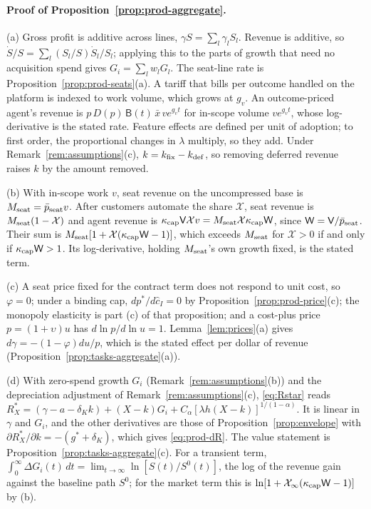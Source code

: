 \paragraph{Proof of Proposition~\ref{prop:prod-aggregate}.}
(a) Gross profit is additive across lines, $\gamma S=\sum_l\gamma_lS_l$. Revenue is additive, so $\dot S/S=\sum_l(S_l/S)\dot S_l/S_l$; applying this to the parts of growth that need no acquisition spend gives $G_i=\sum_lw_lG_l$. The seat-line rate is Proposition~\ref{prop:prod-seats}(a). A tariff that bills per outcome handled on the platform is indexed to work volume, which grows at $g_v$. An outcome-priced agent's revenue is $p\,D(p)\,\mathsf B(t)\,\bar x\,ve^{g_vt}$ for in-scope volume $ve^{g_vt}$, whose log-derivative is the stated rate. Feature effects are defined per unit of adoption; to first order, the proportional changes in $\lambda$ multiply, so they add. Under Remark~\ref{rem:assumptions}(c), $k=k_{\rm fix}-k_{\rm def}$, so removing deferred revenue raises $k$ by the amount removed.

(b) With in-scope work $v$, seat revenue on the uncompressed base is $M_{\rm seat}=\bar p_{\rm seat}v$. After customers automate the share $\mathcal X$, seat revenue is $M_{\rm seat}(1-\mathcal X)$ and agent revenue is $\kappa_{\rm cap}\mathsf V\mathcal Xv=M_{\rm seat}\mathcal X\kappa_{\rm cap}\mathsf W$, since $\mathsf W=\mathsf V/\bar p_{\rm seat}$. Their sum is $M_{\rm seat}[1+\mathcal X(\kappa_{\rm cap}\mathsf W-1)]$, which exceeds $M_{\rm seat}$ for $\mathcal X>0$ if and only if $\kappa_{\rm cap}\mathsf W>1$. Its log-derivative, holding $M_{\rm seat}$'s own growth fixed, is the stated term.

(c) A seat price fixed for the contract term does not respond to unit cost, so $\varphi=0$; under a binding cap, $dp^*/d\hat c_I=0$ by Proposition~\ref{prop:prod-price}(c); the monopoly elasticity is part (c) of that proposition; and a cost-plus price $p=(1+\upsilon)u$ has $d\ln p/d\ln u=1$. Lemma~\ref{lem:prices}(a) gives $d\gamma=-(1-\varphi)du/p$, which is the stated effect per dollar of revenue (Proposition~\ref{prop:tasks-aggregate}(a)).

(d) With zero-spend growth $G_i$ (Remark~\ref{rem:assumptions}(b)) and the depreciation adjustment of Remark~\ref{rem:assumptions}(c), \eqref{eq:Rstar} reads $R^*_X=(\gamma-a-\delta_Kk)+(X-k)G_i+C_\alpha[\lambda h(X-k)]^{1/(1-\alpha)}$. It is linear in $\gamma$ and $G_i$, and the other derivatives are those of Proposition~\ref{prop:envelope} with $\partial R^*_X/\partial k=-(g^*+\delta_K)$, which gives \eqref{eq:prod-dR}. The value statement is Proposition~\ref{prop:tasks-aggregate}(c). For a transient term, $\int_0^\infty\Delta G_i(t)\,dt=\lim_{t\to\infty}\ln[S(t)/S^0(t)]$, the log of the revenue gain against the baseline path $S^0$; for the market term this is $\ln[1+\mathcal X_\infty(\kappa_{\rm cap}\mathsf W-1)]$ by (b).

